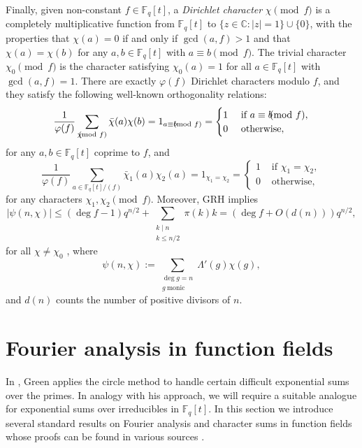 \documentclass{article}
\theoremstyle{definition}
\theoremstyle{definition}
\theoremstyle{remark}
\newcommand{\C}{\mathbb{C}}
\newcommand{\F}{\mathbb{F}_q[t]}
\renewcommand\phi\varphi
\newcommand{\1}{\mathbf{1}}
\numberwithin{equation}{section}
\begin{document}
Finally, given non-constant $f\in\F$, a {\it Dirichlet character} $\chi\pmod{f}$ is a completely multiplicative function from $\F$ to $\{z\in\C\colon |z|=1\}\cup\{0\}$, with the properties that $\chi(a)=0$ if and only if $\gcd(a,f)>1$ and that $\chi(a)=\chi(b)$ for any $a,b\in\F$ with $a\equiv b\pmod{f}$. The trivial character $\chi_0\pmod{f}$ is the character satisfying $\chi_0(a)=1$ for all $a\in\F$ with $\gcd(a,f)=1$. There are exactly $\phi(f)$ Dirichlet characters modulo $f$, and they satisfy the following well-known orthogonality relations:
\[\frac{1}{\phi(f)}\sum_{\chi\hspace*{-2.5mm}\pmod{f}}\bar{\chi}(a)\chi(b)=1_{a\equiv b\hspace*{-2.5mm}\pmod{f}}=
\begin{cases}
1&\text{ if $a\equiv b\hspace*{-2.5mm}\pmod{f}$},\\
0&\text{ otherwise},
\end{cases}\]
for any $a,b\in\F$ coprime to $f$, and
\[\frac{1}{\phi(f)}\sum_{a\in\F/(f)}\bar{\chi}_1(a)\chi_2(a)=1_{\chi_1=\chi_2}=
\begin{cases}
1&\text{ if $\chi_1=\chi_2$},\\
0&\text{ otherwise},
\end{cases}\]
for any characters $\chi_1,\chi_2\pmod{f}$. Moreover, GRH implies 
\begin{equation}\label{eq:charactersum}
|\psi(n,\chi)|\le(\deg f-1)q^{n/2}+\sum_{\substack{k\mid n\\ k\le n/2}}\pi(k)k=\left(\deg f+O\left(d(n)\right)\right)q^{n/2},    
\end{equation}
for all $\chi\ne\chi_0$ \cite{KeatingRudnick2014}, where 
\begin{equation}\label{eq:psi(n,chi)}
\psi(n,\chi):=\sum_{\substack{\deg g=n\\g~\text{monic}}}\Lambda'(g)\chi(g),   
\end{equation}
and $d(n)$ counts the number of positive divisors of $n$. 

\section{Fourier analysis in function fields}

In \cite{Green}, Green applies the circle method to handle certain difficult exponential sums over the primes. In analogy with his approach, we will require a suitable analogue for exponential sums over irreducibles in $\F$. In this section we introduce several standard results on Fourier analysis and character sums in function fields whose proofs can be found in various sources  \cite{Car96,EffingerHayes91,Hayes66,Kubota74,LiuWooley2010}.
\end{document}
